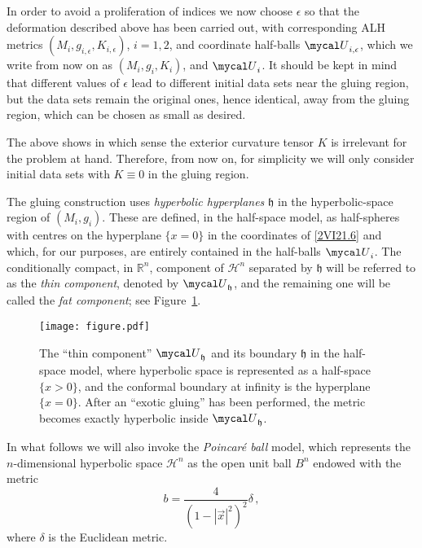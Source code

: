 \documentclass[a4paper,10pt]{article}
\newcommand{\myx}{{\red{x}}}
\newcommand{\horo}{\red{\mathfrak{h}}}
\newcommand{\red}[1]{{\color{red}#1}}
\newcommand{\mcU}{{\mycal U}}
\newcommand{\R}{\mathbb R}
\renewcommand{\red}[1]{#1}%
\begin{document}
      In order to avoid a proliferation of indices we now choose  $\epsilon$
        so that the deformation described above has been carried out, with
      corresponding ALH metrics $(M_i, g_{i,\red{\epsilon}
      },K_{i,\red{\epsilon} })$, $i=1,2$, and  coordinate half-balls
      $\mcU_ {i,\epsilon }$, which we write from now on as $(M_i, g_{i},K_{i})$,
       and   $\mcU_{i}$. It should be kept in mind
      that different values of $\epsilon$ lead to different initial data sets near the
      gluing region, but the data sets remain the original ones, hence identical, away from the gluing region,  which can be chosen as small as desired.

      The above shows in which sense the exterior curvature tensor $K$ is
      irrelevant for the problem at hand. Therefore, from now on, for simplicity we will only
      consider initial data sets with $K\equiv 0$ in the gluing region.

      The gluing construction uses  \emph{hyperbolic hyperplanes} $\horo$ in the
      hyperbolic-space region of $(M_i,g_i)$. These are defined, in the half-space model, as
      half-spheres with centres on the hyperplane $\{\myx=0\}$ in the coordinates of
      \eqref{2VI21.6} and which, for our purposes, are entirely contained in the half-balls $\mcU_i$. The conditionally
      compact, in $\R^n$, component of ${\mathcal H}^n$ separated by $\horo$ will
      be referred to as the \emph{thin component}, denoted by $\mcU_\horo$, and the
      remaining one will be called the \emph{fat component}; see
      Figure~\ref{F2VII21.1}.
       \begin{figure}
        \centering
       \phantom{xx}\texttt{[image: figure.pdf]}
          \caption{The ``thin component'' $\mcU_\horo$ and its boundary $\horo$ in the half-space model, where hyperbolic space is represented as a half-space $\{\myx >0\}$, and the conformal boundary at infinity is the hyperplane $\{\myx =0\}$. After an  ``exotic gluing'' has been performed, the metric becomes exactly hyperbolic inside $\mcU_\horo$.}
        \label{F2VII21.1}
      \end{figure}

      In what follows we will also invoke the \emph{Poincar\'e
      ball} model, which represents the  $n$-dimensional hyperbolic space
      ${\mathcal H}^n$ as the open unit ball $B^n$ endowed with the metric
      \begin{equation}\label{3XI18.4}
        b = \frac{4}{(1-\red{|\vec x|}^2)^2} \delta
        \,,
      \end{equation}
      where $\delta$ is the Euclidean metric.
\end{document}
